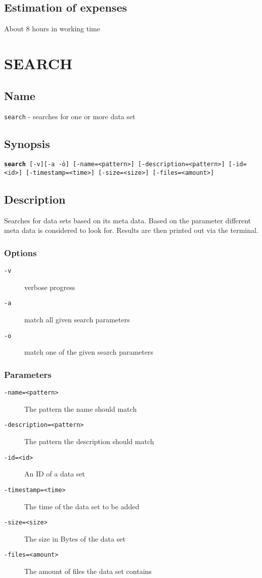 \documentclass{article} %
\begin{document}
		\subsection{Estimation of expenses}
		About 8 hours in working time
		\newpage
		
		\section*{SEARCH}
		\subsection*{Name}
		\texttt{search} - searches for one or more data set
		\subsection*{Synopsis}
		\texttt{\textbf{search} [-v][-a \| -o] [-name=<pattern>] [-description=<pattern>] [-id=<id>] [-timestamp=<time>] [-size=<size>] [-files=<amount>]}
		\subsection*{Description}
		Searches for data sets based on its meta data. Based on the parameter different meta data is considered to look for. Results are then printed out via the terminal.\\
		
		\noindent
		\subsubsection*{Options}
		\begin{description}
			\item[\texttt{-v}] verbose progress
			\item[\texttt{-a}] match all given search parameters
			\item[\texttt{-o}] match one of the given search parameters
		\end{description}
		
		\subsubsection*{Parameters}
		\begin{description}
			\item[\texttt{-name=<pattern>}] The pattern the name should match
			\item[\texttt{-description=<pattern>}] The pattern the description should match
			\item[\texttt{-id=<id>}] An ID of a data set
			\item[\texttt{-timestamp=<time>}] The time of the data set to be added
			\item[\texttt{-size=<size>}] The size in Bytes of the data set
			\item[\texttt{-files=<amount>}] The amount of files the data set contains
		\end{description}
\end{document}
